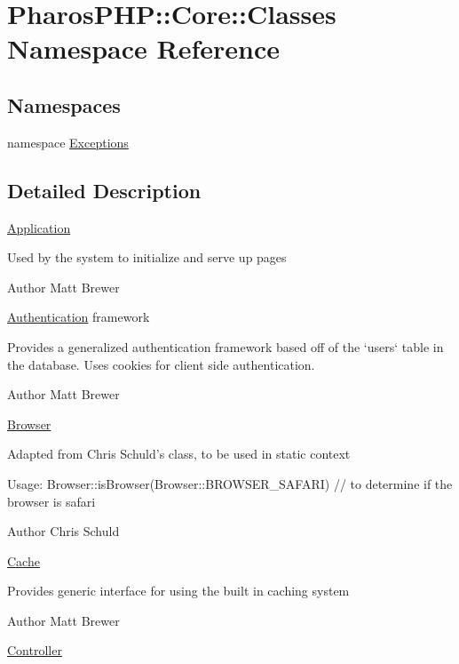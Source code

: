 \hypertarget{namespace_pharos_p_h_p_1_1_core_1_1_classes}{
\section{PharosPHP::Core::Classes Namespace Reference}
\label{namespace_pharos_p_h_p_1_1_core_1_1_classes}
}
\subsection*{Namespaces}
\begin{DoxyCompactItemize}
\item 
namespace \hyperlink{namespace_pharos_p_h_p_1_1_core_1_1_classes_1_1_exceptions}{Exceptions}
\end{DoxyCompactItemize}


\subsection{Detailed Description}
\hyperlink{class_application}{Application}

Used by the system to initialize and serve up pages

\begin{DoxyAuthor}{Author}
Matt Brewer
\end{DoxyAuthor}
\hyperlink{class_authentication}{Authentication} framework

Provides a generalized authentication framework based off of the `users` table in the database. Uses cookies for client side authentication.

\begin{DoxyAuthor}{Author}
Matt Brewer
\end{DoxyAuthor}
\hyperlink{class_browser}{Browser}

Adapted from Chris Schuld's class, to be used in static context

Usage: Browser::isBrowser(Browser::BROWSER\_\-SAFARI) // to determine if the browser is safari

\begin{DoxyAuthor}{Author}
Chris Schuld
\end{DoxyAuthor}
\hyperlink{class_cache}{Cache}

Provides generic interface for using the built in caching system

\begin{DoxyAuthor}{Author}
Matt Brewer
\end{DoxyAuthor}
\hyperlink{class_controller}{Controller}

